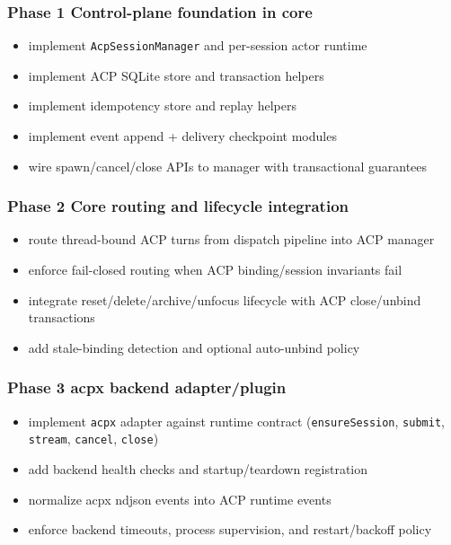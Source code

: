 \subsubsection{Phase 1 Control-plane foundation in core}


\begin{itemize}
  \item implement \texttt{AcpSessionManager} and per-session actor runtime
  \item implement ACP SQLite store and transaction helpers
  \item implement idempotency store and replay helpers
  \item implement event append + delivery checkpoint modules
  \item wire spawn/cancel/close APIs to manager with transactional guarantees
\end{itemize}


\subsubsection{Phase 2 Core routing and lifecycle integration}


\begin{itemize}
  \item route thread-bound ACP turns from dispatch pipeline into ACP manager
  \item enforce fail-closed routing when ACP binding/session invariants fail
  \item integrate reset/delete/archive/unfocus lifecycle with ACP close/unbind transactions
  \item add stale-binding detection and optional auto-unbind policy
\end{itemize}


\subsubsection{Phase 3 acpx backend adapter/plugin}


\begin{itemize}
  \item implement \texttt{acpx} adapter against runtime contract (\texttt{ensureSession}, \texttt{submit}, \texttt{stream}, \texttt{cancel}, \texttt{close})
  \item add backend health checks and startup/teardown registration
  \item normalize acpx ndjson events into ACP runtime events
  \item enforce backend timeouts, process supervision, and restart/backoff policy
\end{itemize}


